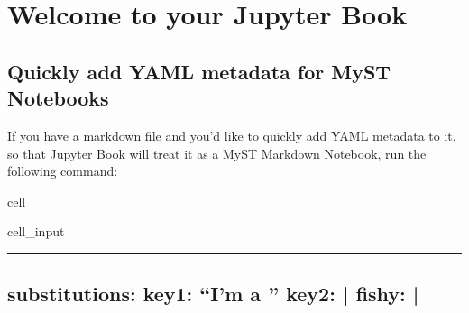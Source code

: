 \documentclass[letterpaper,10pt,english]{jupyterBook}
\begin{document}
\sphinxstepscope


\chapter{Welcome to your Jupyter Book}
\label{\detokenize{intro:welcome-to-your-jupyter-book}}\label{\detokenize{intro::doc}}

\section{Quickly add YAML metadata for MyST Notebooks}
\label{\detokenize{intro:quickly-add-yaml-metadata-for-myst-notebooks}}
\sphinxAtStartPar
If you have a markdown file and you’d like to quickly add YAML metadata to it, so that Jupyter Book will treat it as a MyST Markdown Notebook, run the following command:

\begin{sphinxuseclass}{cell}\begin{sphinxVerbatimInput}

\begin{sphinxuseclass}{cell_input}
\begin{sphinxVerbatim}[commandchars=\\\{\}]
   
\end{sphinxVerbatim}

\end{sphinxuseclass}\end{sphinxVerbatimInput}

\end{sphinxuseclass}

\bigskip\hrule\bigskip



\section{substitutions:
key1: “I’m a ”
key2: |
fishy: |
}
\label{\detokenize{intro:substitutions-key1-im-a-substitution-key2-note-key1-fishy-image-img-fun-fish-png-alt-fishy-width-200px}}
\sphinxAtStartPar
{}
\end{document}
